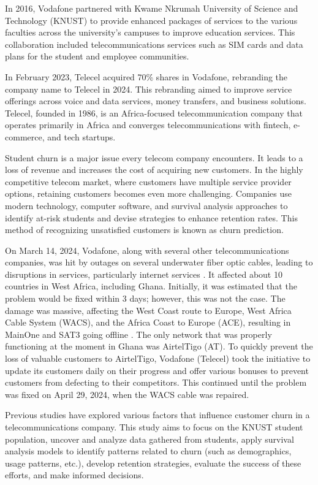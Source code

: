 \documentclass[12pt]{report}
\begin{document}
In 2016, Vodafone partnered with Kwame Nkrumah University of Science and Technology (KNUST) to provide enhanced packages of services to the various faculties across the university's campuses to improve education services. This collaboration included telecommunications services such as SIM cards and data plans for the student and employee communities.

In February 2023, Telecel acquired 70\% shares in Vodafone, rebranding the company name to Telecel in 2024. This rebranding aimed to improve service offerings across voice and data services, money transfers, and business solutions. Telecel, founded in 1986, is an Africa-focused telecommunication company that operates primarily in Africa and converges telecommunications with fintech, e-commerce, and tech startups.

Student churn is a major issue every telecom company encounters. It leads to a loss of revenue and increases the cost of acquiring new customers. In the highly competitive telecom market, where customers have multiple service provider options, retaining customers becomes even more challenging. Companies use modern technology, computer software, and survival analysis approaches to identify at-risk students and devise strategies to enhance retention rates. This method of recognizing unsatisfied customers is known as churn prediction.

On March 14, 2024, Vodafone, along with several other telecommunications companies, was hit by outages on several underwater fiber optic cables, leading to disruptions in services, particularly internet services \cite{ghanaweb2023}. It affected about 10 countries in West Africa, including Ghana. Initially, it was estimated that the problem would be fixed within 3 days; however, this was not the case. The damage was massive, affecting the West Coast route to Europe, West Africa Cable System (WACS), and the Africa Coast to Europe (ACE), resulting in MainOne and SAT3 going offline \cite{apnews2023}. The only network that was properly functioning at the moment in Ghana was AirtelTigo (AT). To quickly prevent the loss of valuable customers to AirtelTigo, Vodafone (Telecel) took the initiative to update its customers daily on their progress and offer various bonuses to prevent customers from defecting to their competitors. This continued until the problem was fixed on April 29, 2024, when the WACS cable was repaired.

Previous studies have explored various factors that influence customer churn in a telecommunications company. This study aims to focus on the KNUST student population, uncover and analyze data gathered from students, apply survival analysis models to identify patterns related to churn (such as demographics, usage patterns, etc.), develop retention strategies, evaluate the success of these efforts, and make informed decisions.
\end{document}
